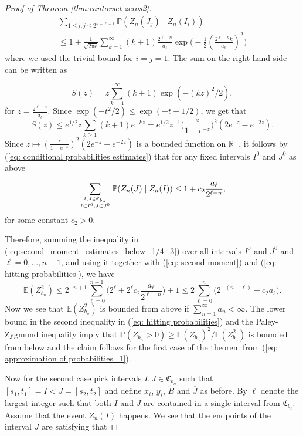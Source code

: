 \documentclass[11pt,reqno]{amsart}
\theoremstyle{plain}
\theoremstyle{definition}
\theoremstyle{remark}
\begin{document}
\begin{proof}[Proof of Theorem \ref{thm:cantorset-zeros2}]
\begin{multline}\label{eq: conditional probabilities estimates}
\sum_{1 \leq i,j \leq 2^{n-\ell-1}}\mathbb{P}(Z_n(J_j) \mid Z_n(I_i))
\\
\leq 1 + \frac{1}{\sqrt{2\pi\epsilon}}
\sum_{k=1}^{\infty}(k+1)\frac{2^{\ell-n}}{a_\ell}\exp\Big(-\frac{1}{2}(\frac{2^{\ell-n}k}{a_\ell})^2\Big)
\end{multline}
where we used the trivial bound for $i=j=1$. The sum on the right hand side can be written as

\begin{equation*}
S(z)=z\sum_{k = 1}^\infty(k+1)\exp(-(kz)^2/2),
\end{equation*}
for $z=\frac{2^{\ell-n}}{a_\ell}$. Since $\exp(-t^2/2) \leq \exp(-t+1/2)$, we get that
\[
S(z) \leq e^{1/2}z\sum_{k \geq 1}(k+1)e^{-kz} = e^{1/2}z^{-1}\Big(\frac{z}{1-e^{-z}}\Big)^2(2e^{-z}-e^{-2z}).
\]
Since $z\mapsto (\frac{z}{1-e^{-z}})^2(2e^{-z}-e^{-2z})$ is a bounded function on $\mathbb{R}^+$, it follows by (\ref{eq: conditional probabilities estimates}) that for any fixed intervals $I^0$ and $J^0$ as above

\begin{equation}
\label{eq:second_moment_estimates_below_1/4_3}
\sum_{I,J \in \mathfrak{C}_{b_n} \atop I \subset I^0, J \subset J^0} \mathbb{P}(Z_n(J) \mid Z_n(I)) \leq 1+c_2 \frac{a_\ell}{2^{\ell-n}},
\end{equation}
for some constant $c_2>0$.

Therefore, summing the inequality in (\ref{eq:second_moment_estimates_below_1/4_3}) over all intervals $I^0$ and $J^0$ and $\ell=0, \dots , n-1$, and using it together with (\ref{eq: second moment}) and (\ref{eq: hitting probabilities}), we have
\[
\mathbb{E}(Z_{b_n}^2)
\leq 2^{-n+1} \sum_{\ell=0}^{n-1}\Big(2^\ell + 2^\ell c_2 \frac{a_\ell}{2^{\ell-n}}\Big) + 1 \leq 2\sum_{\ell=0}^n\Big(2^{-(n-\ell)} + c_2 a_\ell\Big).
\]
Now we see that $\mathbb{E}(Z_{b_n}^2)$ is bounded from above if $\sum_{n=1}^{\infty} a_n < \infty$. The lower bound in the second inequality in (\ref{eq: hitting probabilities}) and the Paley-Zygmund inequality imply that $\mathbb{P}(Z_{b_n}>0) \geq \mathbb{E}(Z_{b_n})^2/\mathbb{E}(Z_{b_n}^2)$ is bounded from below and the claim follows for the first case of the theorem from (\ref{eq: approximation of probabilities_1}).

Now for the second case pick intervals $I,J \in \mathfrak{C}_{b_n}$ such that $[s_1,t_1]=I < J =[s_2,t_2]$ and define $x_i$, $y_i$, $\widetilde{B}$ and $\overline{J}$ as before.
By $\ell$ denote the largest integer such that both $I$ and $J$ are contained in a single interval from $\mathfrak{C}_{b_\ell}$.
Assume that the event $Z_n(I)$ happens.
We see that the endpoints of the interval $\overline{J}$ are satisfying that


\end{proof}
\end{document}
